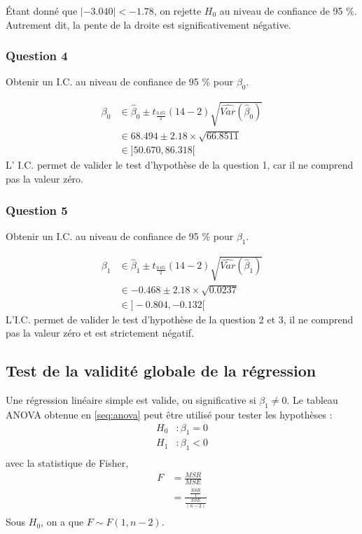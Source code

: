 \documentclass[11pt,french]{report}
\begin{document}
Étant donné que $|-3.040| < -1.78$, on rejette $H_0$ au niveau de confiance de 95 \%. Autrement dit, la pente de la droite est significativement négative.

\subsubsection*{Question 4}
Obtenir un I.C. au niveau de confiance de 95 \% pour $\beta_0$.

\begin{align*}
\beta_0 &\in \hat{\beta}_0 \pm t_{\frac{0.05}{2}}(14-2)\sqrt{\widehat{Var}(\hat{\beta}_0)} \\
& \in 68.494 \pm 2.18 \times \sqrt{66.8511} \\
&\in \big] 50.670, 86.318 \big[
\end{align*}
L' I.C. permet de valider le test d'hypothèse de la question 1, car il ne comprend pas la valeur zéro.

\subsubsection*{Question 5}
Obtenir un I.C. au niveau de confiance de 95 \% pour $\beta_1$.

\begin{align*}
\beta_1 &\in \hat{\beta}_1 \pm t_{\frac{0.05}{2}}(14-2)\sqrt{\widehat{Var}(\hat{\beta}_1)} \\
& \in -0.468 \pm 2.18 \times \sqrt{0.0237} \\
&\in \big] -0.804, -0.132 \big[
\end{align*}
L'I.C. permet de valider le test d'hypothèse de la question 2 et 3, il ne comprend pas la valeur zéro et est strictement négatif.

\subsection{Test de la validité globale de la régression}
Une régression linéaire simple est valide, ou significative si $\beta_1 \neq 0$. Le tableau ANOVA obtenue en \ref{seq:anova} peut être utilisé pour tester les hypothèses :
\begin{align*}
H_0 &: \beta_1 = 0\\
H_1 &: \beta_1 < 0 \\
\end{align*}
avec la statistique de Fisher,
\begin{align*}
F &= \frac{MSR}{MSE} \\
&= \frac{\frac{SSR}{1}}{\frac{SSE}{(n-2)}} \\
\end{align*}
Sous $H_0$, on a que $F \sim F(1, n-2)$. \newline
\end{document}
